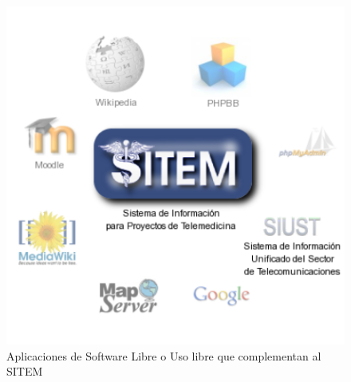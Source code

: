 \begin{figure}
 \centering
 \includegraphics[width=120mm]{sitem_aplicaciones.png}
 \caption{Aplicaciones de Software Libre o Uso libre que complementan al SITEM}
 \label{aplicaciones_sitem}
\end{figure}